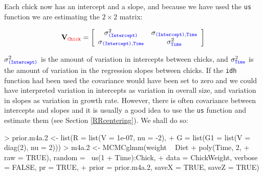 \documentclass{article}
\begin{document}
Each chick now has an intercept and a slope, and because we have used the \texttt{us} function we are estimating the $2\times2$ matrix:

\begin{displaymath}
{\bf V}_{{\color{red} \texttt{Chick}}}=
\left[
\begin{array}{cc}
\sigma^{2}_{\color{blue}\texttt{(Intercept)}}&\sigma_{\color{blue}\texttt{(Intercept)}, \texttt{Time}}\\
\sigma_{\color{blue}\texttt{(Intercept)}, \texttt{Time}}&\sigma^{2}_{\color{blue} \texttt{Time}}\\
\end{array}
\right]
\end{displaymath}

$\sigma^{2}_{\color{blue}\texttt{(Intercept)}}$ is the amount of variation in intercepts between chicks, and $\sigma^{2}_{\color{blue}\texttt{Time}}$ is the amount of variation in the regression slopes between chicks. If the \texttt{idh} function had been used the covariance would have been set to zero and we could have interpreted variation in intercepts as variation in overall size, and variation in slopes as variation in growth rate.  However, there is often covariance between intercepts and slopes and it is usually a good idea to use the \texttt{us} function and estimate them (see Section \ref{RRcentering}). We shall do so: 

\begin{Schunk}
\begin{Sinput}
> prior.m4a.2 <- list(R = list(V = 1e-07, nu = -2), 
+     G = list(G1 = list(V = diag(2), nu = 2)))
> m4a.2 <- MCMCglmm(weight ~ Diet + poly(Time, 2, 
+     raw = TRUE), random = ~us(1 + Time):Chick, 
+     data = ChickWeight, verbose = FALSE, pr = TRUE, 
+     prior = prior.m4a.2, saveX = TRUE, saveZ = TRUE)
\end{Sinput}
\end{Schunk}
\end{document}
